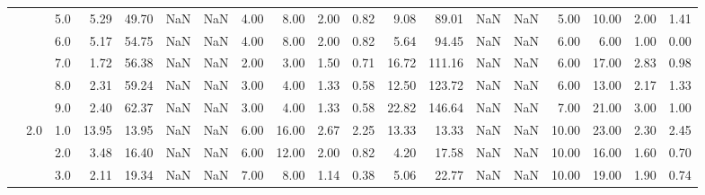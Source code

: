 \begin{tabular}{lllrrrrrrrrrrrrrrrr}
          &     & 5.0  &      5.29 &      49.70 &               NaN &                NaN &  4.00 &   8.00 &             2.00 &                         0.82 &      9.08 &      89.01 &               NaN &                NaN &  5.00 &  10.00 &             2.00 &                         1.41 \\
          &     & 6.0  &      5.17 &      54.75 &               NaN &                NaN &  4.00 &   8.00 &             2.00 &                         0.82 &      5.64 &      94.45 &               NaN &                NaN &  6.00 &   6.00 &             1.00 &                         0.00 \\
          &     & 7.0  &      1.72 &      56.38 &               NaN &                NaN &  2.00 &   3.00 &             1.50 &                         0.71 &     16.72 &     111.16 &               NaN &                NaN &  6.00 &  17.00 &             2.83 &                         0.98 \\
          &     & 8.0  &      2.31 &      59.24 &               NaN &                NaN &  3.00 &   4.00 &             1.33 &                         0.58 &     12.50 &     123.72 &               NaN &                NaN &  6.00 &  13.00 &             2.17 &                         1.33 \\
          &     & 9.0  &      2.40 &      62.37 &               NaN &                NaN &  3.00 &   4.00 &             1.33 &                         0.58 &     22.82 &     146.64 &               NaN &                NaN &  7.00 &  21.00 &             3.00 &                         1.00 \\
          & 2.0 & 1.0  &     13.95 &      13.95 &               NaN &                NaN &  6.00 &  16.00 &             2.67 &                         2.25 &     13.33 &      13.33 &               NaN &                NaN & 10.00 &  23.00 &             2.30 &                         2.45 \\
          &     & 2.0  &      3.48 &      16.40 &               NaN &                NaN &  6.00 &  12.00 &             2.00 &                         0.82 &      4.20 &      17.58 &               NaN &                NaN & 10.00 &  16.00 &             1.60 &                         0.70 \\
          &     & 3.0  &      2.11 &      19.34 &               NaN &                NaN &  7.00 &   8.00 &             1.14 &                         0.38 &      5.06 &      22.77 &               NaN &                NaN & 10.00 &  19.00 &             1.90 &                         0.74 \\

\end{tabular}
